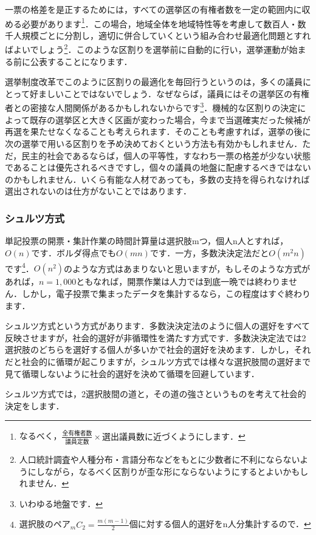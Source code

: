 一票の格差を是正するためには，すべての選挙区の有権者数を一定の範囲内に収める必要があります\footnote{なるべく，$\frac{全有権者数}{議員定数}\times 選出議員数に近づくようにします．$}．この場合，地域全体を地域特性等を考慮して数百人・数千人規模ごとに分割し，適切に併合していくという組み合わせ最適化問題とすればよいでしょう\footnote{人口統計調査や人種分布・言語分布などをもとに少数者に不利にならないようにしながら，なるべく区割りが歪な形にならないようにするとよいかもしれません．}．このような区割りを選挙前に自動的に行い，選挙運動が始まる前に公表することになります．

選挙制度改革でこのように区割りの最適化を毎回行うというのは，多くの議員にとって好ましいことではないでしょう．なぜならば，議員にはその選挙区の有権者との密接な人間関係があるかもしれないからです\footnote{いわゆる地盤です．}．機械的な区割りの決定によって既存の選挙区と大きく区画が変わった場合，今まで当選確実だった候補が再選を果たせなくなることも考えられます．そのことも考慮すれば，選挙の後に次の選挙で用いる区割りを予め決めておくという方法も有効かもしれません．ただ，民主的社会であるならば，個人の平等性，すなわち一票の格差が少ない状態であることは優先されるべきですし，個々の議員の地盤に配慮するべきではないのかもしれません．いくら有能な人材であっても，多数の支持を得られなければ選出されないのは仕方がないことではあります．

\subsubsection*{シュルツ方式}
単記投票の開票・集計作業の時間計算量は選択肢mつ，個人n人とすれば，$O(n)$です．ボルダ得点でも$O(mn)$です．一方，多数決決定法だと$O(m^2 n)$です\footnote{選択肢のペア$_mC_2 = \frac{m(m-1)}{2}$個に対する個人的選好をn人分集計するので．}．$O(n^2)$のような方式はあまりないと思いますが，もしそのような方式があれば，$n = 1,000$ともなれば，開票作業は人力では到底一晩では終わりません．しかし，電子投票で集まったデータを集計するなら，この程度はすぐ終わります．

シュルツ方式という方式があります．多数決決定法のように個人の選好をすべて反映させますが，社会的選好が非循環性を満たす方式です．多数決決定法では2選択肢のどちらを選好する個人が多いかで社会的選好を決めます．しかし，それだと社会的に循環が起こりますが，シュルツ方式では様々な選択肢間の選好まで見て循環しないように社会的選好を決めて循環を回避しています．

シュルツ方式では，2選択肢間の道と，その道の強さというものを考えて社会的決定をします．

